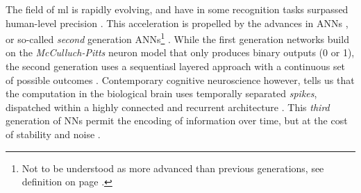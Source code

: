 


\begin{comment}
\gls{ANN}s have been studied extensively and have surpassed human performance
in a number of tasks (most recently the 
advanced real-time strategy game Starcraft II \cite{DeepMind2019})
\autocite{Schmidhuber2014, Nilsson2009, Russel2007}.
\gls{SNN}s have been studied extensively in smaller applications such as single-neuron studies 
\autocite{Dayan2001, Indiveri2015}, but studies in larger scale are still rare,
although \textcite{Hunsberger2015, Jordan2018, Lin2018, Pfeil2013,
Rueckauer2017, Schmitt2017} have constructed classifiers that reach
near-\gls{ANN} precision, but with a 


\gls{SNN}s have been studied extensively in smaller applications such as single-neuron studies, but less so in larger setups such as learning and classification tasks \autocite{dayan2001, Indiveri2015}.
Conversely \gls{ANN}s have been extensively studied in more complex tasks where architectures such as \gls{DNN} have excelled \autocite{schmidhuber2014, Nilsson2009, russel2007}.
\end{comment}

The field of \gls{ml} is rapidly evolving, and have in
some recognition tasks surpassed human-level precision
\autocite{Schmidhuber2014}.
This acceleration is propelled by the advances in \gls{ANN}s
\autocite{Rumelhart1988, Schmidhuber2014, Nilsson2009}, or
so-called \textit{second} generation \gls{ANN}s\footnote{Not to be 
understood as more advanced than previous generations, see definition on page
\pageref{sec:glossary}.} \cite{Maass1997}.
While the first generation networks build on the \textit{McCulluch-Pitts}
neuron model that only produces binary outputs (0 or 1), the second
generation uses a sequentiasl layered approach with a continuous set of 
possible outcomes \cite{Maass1997, Russel2007}.
Contemporary cognitive neuroscience however, tells us that the computation
in the biological brain uses temporally separated \textit{spikes}, 
dispatched within a highly connected and recurrent architecture 
\cite{Dayan2001, Eliasmith2004}.
This \textit{third} generation of \gls{NN}s permit the encoding
of information over time, but at the cost of stability and 
noise \autocite{Maass1997}.

